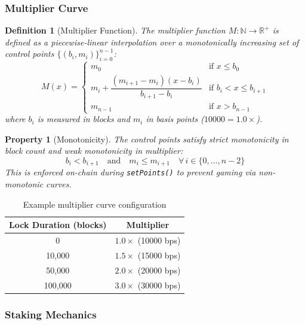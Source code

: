 \documentclass[11pt,a4paper]{article}
\newtheorem{definition}{Definition}[section]
\newtheorem{property}{Property}[section]
\begin{document}
\subsubsection{Multiplier Curve}

\begin{definition}[Multiplier Function]
The multiplier function $M: \mathbb{N} \to \mathbb{R}^+$ is defined as a piecewise-linear interpolation over a monotonically increasing set of control points $\{(b_i, m_i)\}_{i=0}^{n-1}$:
\begin{equation}
M(x) = \begin{cases}
m_0 & \text{if } x \leq b_0 \\[6pt]
m_i + \dfrac{(m_{i+1} - m_i)(x - b_i)}{b_{i+1} - b_i} & \text{if } b_i < x \leq b_{i+1} \\[6pt]
m_{n-1} & \text{if } x > b_{n-1}
\end{cases}
\label{eq:multiplier}
\end{equation}
where $b_i$ is measured in blocks and $m_i$ in basis points ($10000 = 1.0\times$).
\end{definition}

\begin{property}[Monotonicity]
The control points satisfy strict monotonicity in block count and weak monotonicity in multiplier:
\begin{equation}
b_i < b_{i+1} \quad \text{and} \quad m_i \leq m_{i+1} \quad \forall\, i \in \{0, \ldots, n-2\}
\end{equation}
This is enforced on-chain during \texttt{setPoints()} to prevent gaming via non-monotonic curves.
\end{property}

\begin{table}[H]
\centering
\begin{tabular}{cc}
\toprule
\textbf{Lock Duration (blocks)} & \textbf{Multiplier} \\
\midrule
0 & $1.0\times$ (10000 bps) \\
10{,}000 & $1.5\times$ (15000 bps) \\
50{,}000 & $2.0\times$ (20000 bps) \\
100{,}000 & $3.0\times$ (30000 bps) \\
\bottomrule
\end{tabular}
\caption{Example multiplier curve configuration}
\end{table}

\subsubsection{Staking Mechanics}
\end{document}
